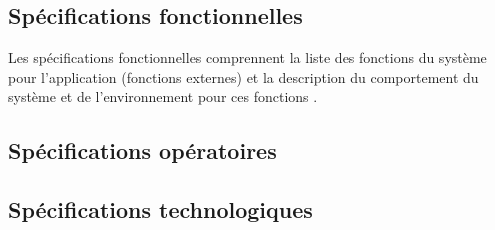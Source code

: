 \newpage

\subsection{Spécifications fonctionnelles}
Les spécifications fonctionnelles comprennent la liste des fonctions du système
pour l'application (fonctions externes) et la description du comportement du système et
de l'environnement pour ces fonctions \cite{Calvez_2}.

\gap


\subsection{Spécifications opératoires}
\subsection{Spécifications technologiques}